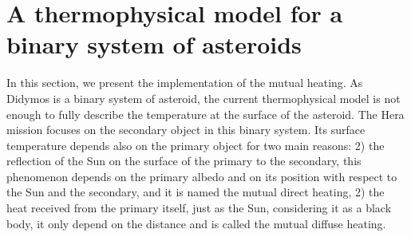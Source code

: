 \section{A thermophysical model for a binary system of asteroids}
\label{mutual}

In this section, we present the implementation of the mutual heating. As Didymos is a binary system of asteroid, the current thermophysical model is not enough to fully describe the temperature at the surface of the asteroid. The Hera mission focuses on the secondary object in this binary system. Its surface temperature depends also on the primary object for two main reasons: 2) the reflection of the Sun on the surface of the primary to the secondary, this phenomenon depends on the primary albedo and on its position with respect to the Sun and the secondary, and it is named the mutual direct heating, 2) the heat received from the primary itself, just as the Sun, considering it as a black body, it only depend on the distance and is called the mutual diffuse heating.

